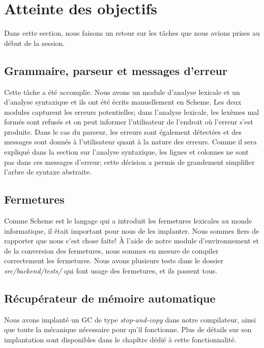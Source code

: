 \documentclass[11pt]{report}
\begin{document}
\section{Atteinte des objectifs}

Dans cette section, nous faisons un retour sur les tâches que nous
avions prises au début de la session.

\subsection{Grammaire, parseur et messages d'erreur}

Cette tâche a été accomplie. Nous avons un module d'analyse lexicale
et un d'analyse syntaxique et ils ont été écrits manuellement en
Scheme. Les deux modules capturent les erreurs potentielles; dans
l'analyse lexicale, les lexèmes mal formés sont refusés et on peut
informer l'utilisateur de l'endroit où l'erreur s'est produite. Dans
le cas du parseur, les erreurs sont également détectées et des
messages sont donnés à l'utilisateur quant à la nature des erreurs.
Comme il sera expliqué dans la section sur l'analyse syntaxique, les
lignes et colonnes ne sont pas dans ces messages d'erreur; cette
décision a permis de grandement simplifier l'arbre de syntaxe
abstraite.


\subsection{Fermetures}

Comme Scheme est le langage qui a introduit les fermetures lexicales
au monde informatique, il était important pour nous de les implanter.
Nous sommes fiers de rapporter que nous c'est chose faite!  À l'aide
de notre module d'environnement et de la conversion des fermetures,
nous sommes en mesure de compiler correctement les fermetures.  Nous
avons plusieurs tests dans le dossier {\it src/backend/tests/} qui
font usage des fermetures, et ils passent tous.

\subsection{Récupérateur de mémoire automatique}

Nous avons implanté un GC de type {\it stop-and-copy} dans notre
compilateur, ainsi que toute la mécanique nécessaire pour qu'il
fonctionne. Plus de détails sur son implantation sont disponibles dans
le chapître dédié à cette fonctionnalité.
\end{document}
